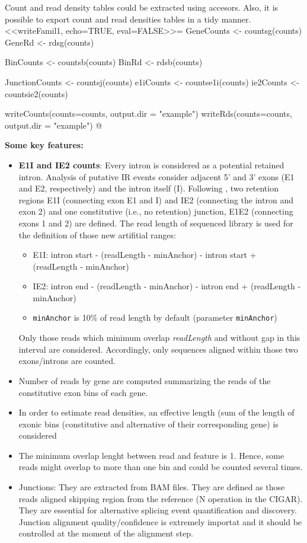 \documentclass{article}
\begin{document}
Count and read density tables could be extracted using accesors. Also, it is possible to export count and read densities tables in a tidy manner.
<<writeFamil1, echo=TRUE, eval=FALSE>>=
GeneCounts <- countsg(counts)
GeneRd <- rdsg(counts)

BinCounts <- countsb(counts)
BinRd <- rdsb(counts)

JunctionCounts <- countsj(counts)
e1iCounts <- countse1i(counts)
ie2Counts <- countsie2(counts)

writeCounts(counts=counts, output.dir = "example")
writeRds(counts=counts, output.dir = "example")
@

\textbf{Some key features:}
\begin{itemize}
\item \textbf{E1I and IE2 counts}: Every intron is considered as a potential retained intron. Analysis of putative IR events consider  adjacent 5' and 3' exons (E1 and E2, respectively) and the intron itself (I). Following \cite{pmid25258385}, two retention regions E1I (connecting exon E1 and I) and IE2 (connecting the intron and exon 2) and one constitutive (i.e., no retention) junction, E1E2 (connecting exons 1 and 2) are defined. The read length of sequenced library is used for the definition of those new artifitial ranges:
\begin{itemize}
  \item E1I: intron start - (readLength - minAnchor) - intron start + (readLength - minAnchor)
  \item IE2: intron end - (readLength - minAnchor) - intron end + (readLength - minAnchor)
  \item \texttt{minAnchor} is 10\% of read length by default (parameter \texttt{minAnchor})
\end{itemize}
Only those reads which minimum overlap \textit{readLength} and without gap in this interval are considered. Accordingly, only sequences aligned within those two exons/introns are counted. 
\item Number of reads by gene are computed summarizing the reads of the constitutive exon bins of each gene. 
\item In order to estimate read densities, an effective length (sum of the length of exonic bins (constitutive and alternative of their corresponding gene) is considered
\item The minimum overlap lenght between read and feature is 1. Hence, some reads might overlap to more than one bin  and could be counted several times.
\item Junctions: They are extracted from BAM files. They are defined as those reads aligned skipping region from the reference (N operation in the CIGAR). They are essential for alternative splicing event quantification and discovery. Junction alignment quality/confidence is extremely importat and it should be controlled at the moment of the alignment step.
\end{itemize} 
\end{document}
